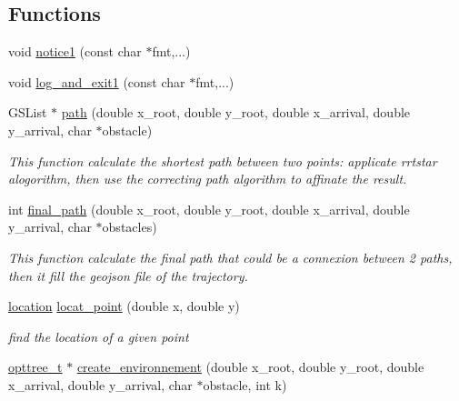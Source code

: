 \subsection*{\-Functions}
\begin{DoxyCompactItemize}
\item 
void \hyperlink{a00016_abb72a9e5586947ffa14de7aea6c8d7b4_abb72a9e5586947ffa14de7aea6c8d7b4}{notice1} (const char $\ast$fmt,...)
\item 
void \hyperlink{a00016_ab369473e6f056b28d426c97004c47828_ab369473e6f056b28d426c97004c47828}{log\-\_\-and\-\_\-exit1} (const char $\ast$fmt,...)
\item 
\-G\-S\-List $\ast$ \hyperlink{a00016_a5fbe870a8fdafd7aedaf1591ffb214a9_a5fbe870a8fdafd7aedaf1591ffb214a9}{path} (double x\-\_\-root, double y\-\_\-root, double x\-\_\-arrival, double y\-\_\-arrival, char $\ast$obstacle)
\begin{DoxyCompactList}\small\item\em \-This function calculate the shortest path between two points\-: applicate rrtstar alogorithm, then use the correcting path algorithm to affinate the result. \end{DoxyCompactList}\item 
int \hyperlink{a00016_a532b02ac2742a326fa4ad3f41e640a86_a532b02ac2742a326fa4ad3f41e640a86}{final\-\_\-path} (double x\-\_\-root, double y\-\_\-root, double x\-\_\-arrival, double y\-\_\-arrival, char $\ast$obstacles)
\begin{DoxyCompactList}\small\item\em \-This function calculate the final path that could be a connexion between 2 paths, then it fill the geojson file of the trajectory. \end{DoxyCompactList}\item 
\hyperlink{a00016_a5f269c22e6d9d32b0b0ad7e6166854df_a5f269c22e6d9d32b0b0ad7e6166854df}{location} \hyperlink{a00016_a8fccd24d5b565d686f8ffd2820bf372a_a8fccd24d5b565d686f8ffd2820bf372a}{locat\-\_\-point} (double x, double y)
\begin{DoxyCompactList}\small\item\em find the location of a given point \end{DoxyCompactList}\item 
\hyperlink{a00020_a07b75293fafb6f31b7e9f723848ad105_a07b75293fafb6f31b7e9f723848ad105}{opttree\-\_\-t} $\ast$ \hyperlink{a00016_ad57de17f688b7fd9ae8db3dee4c728a3_ad57de17f688b7fd9ae8db3dee4c728a3}{create\-\_\-environnement} (double x\-\_\-root, double y\-\_\-root, double x\-\_\-arrival, double y\-\_\-arrival, char $\ast$obstacle, int k)

\end{DoxyCompactItemize}
